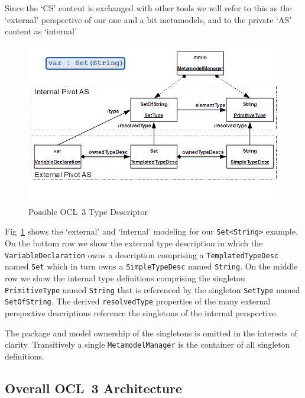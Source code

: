 \documentclass{jot}
\begin{document}
Since the `CS' content is exchanged with other tools we will refer to this as the `external' perspective of our one and a bit metamodels, and to the private `AS' content as `internal'

\begin{figure}
	\begin{center}
		\includegraphics[width=5.0in]{OCL3TypeDescriptor.png}
	\end{center}
	\vspace{-40pt}
	\caption{Possible OCL~3 Type Descriptor}
	\label{fig:OCL3TypeDescriptor}
\end{figure}

Fig~\ref{fig:OCL3TypeDescriptor} shows the `external' and `internal' modeling for our \verb$Set<String>$ example. On the bottom row we show the external type description in which the \verb$VariableDeclaration$ owns a description comprising a \verb$TemplatedTypeDesc$ named \verb$Set$ which in turn owns a \verb$SimpleTypeDesc$ named \verb$String$. On the middle row we show the internal type definitions comprising the singleton \verb$PrimitiveType$ named \verb$String$ that is referenced by the singleton \verb$SetType$ named \verb$SetOfString$. The  derived \verb$resolvedType$ properties of the many external perspective descriptions reference the singletons of the internal perspective.

The package and model ownership of the singletons is omitted in the interests of clarity. Transitively a single \verb$MetamodelManager$ is the container of all singleton definitions.

\subsection{Overall OCL~3 Architecture}
\end{document}
